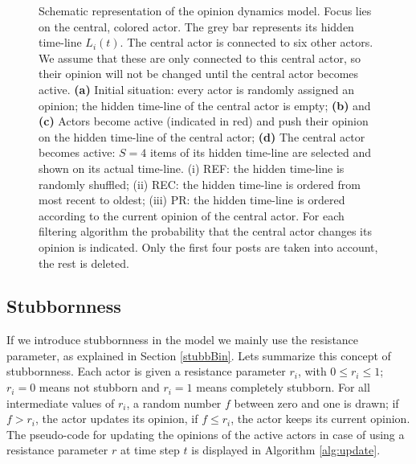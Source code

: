 \documentclass[11 pt , letterpaper , twoside , openright]{book}
\begin{document}
\begin{figure}[H]
  \caption[Schematic representation of the opinion dynamics model.]{Schematic representation of the opinion dynamics model. Focus lies on the central, colored actor. The grey bar represents its hidden time-line $L_i(t)$. The central actor is connected to six other actors. We assume that these are only connected to this central actor, so their opinion will not be changed until the central actor becomes active. \textbf{(a)} Initial situation: every actor is randomly assigned an opinion; the hidden time-line of the central actor is empty; \textbf{(b)} and \textbf{(c)} Actors become active (indicated in red) and push their opinion on the hidden time-line of the central actor; \textbf{(d)} The central actor becomes active: $S = 4$ items of its hidden time-line are selected and shown on its actual time-line. (i) REF: the hidden time-line is randomly shuffled; (ii) REC: the hidden time-line is ordered from most recent to oldest; (iii) PR: the hidden time-line is ordered according to the current opinion of the central actor. For each filtering algorithm the probability that the central actor changes its opinion is indicated. Only the first four posts are taken into account, the rest is deleted.}
\label{op_dyn_schem}
\end{figure}

\subsection{Stubbornness}

If we introduce stubbornness in the model we mainly use the resistance parameter, as explained in Section \ref{stubbBin}. Lets summarize this concept of stubbornness. Each actor is given a resistance parameter $r_i$, with $0 \leqslant r_i \leqslant 1$; $r_i = 0$ means not stubborn and $r_i = 1$ means completely stubborn. For all intermediate values of $r_i$, a random number $f$ between zero and one is drawn; if $f > r_i$, the actor updates its opinion, if $f \leqslant r_i$, the actor keeps its current opinion. \\
\newline
The pseudo-code for updating the opinions of the active actors in case of using a resistance parameter $r$ at time step $t$ is displayed in Algorithm \ref{alg:update}.
\end{document}
